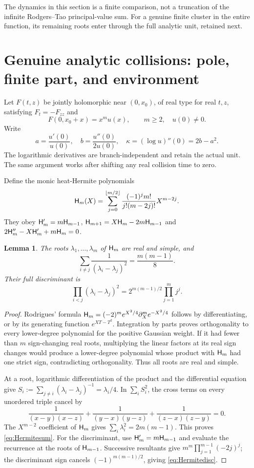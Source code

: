 \documentclass[11pt,a4paper]{article}
\newtheorem{lemma}[theorem]{Lemma}
\theoremstyle{definition}
\begin{document}
The dynamics in this section is a finite comparison, not a truncation of the infinite Rodgers--Tao principal-value sum. For a genuine finite cluster in the entire function, its remaining roots enter through the full analytic unit, retained next.

\section{Genuine analytic collisions: pole, finite part, and environment}
Let $F(t,z)$ be jointly holomorphic near $(0,x_0)$, of real type for real $t,z$, satisfying $F_t=-F_{zz}$ and
\[
 F(0,x_0+x)=x^m u(x),\qquad m\ge2,\quad u(0)\ne0.
\]
Write
\[
 a=\frac{u'(0)}{u(0)},\quad b=\frac{u''(0)}{2u(0)},\quad
 \kappa=(\log u)''(0)=2b-a^2.
\]
The logarithmic derivatives are branch-independent and retain the actual unit. The same argument works after shifting any real collision time to zero.

Define the monic heat-Hermite polynomials
\[
 \mathsf H_m(X)=\sum_{j=0}^{\lfloor m/2\rfloor}
 \frac{(-1)^j m!}{j!(m-2j)!}X^{m-2j}.
\]
They obey $\mathsf H_m'=m\mathsf H_{m-1}$,
$\mathsf H_{m+1}=X\mathsf H_m-2m\mathsf H_{m-1}$ and
$2\mathsf H_m''-X\mathsf H_m'+m\mathsf H_m=0$.

\begin{lemma}\label{lem:hermite}
The roots $\lambda_1,\ldots,\lambda_m$ of $\mathsf H_m$ are real and simple, and
\begin{equation}\label{eq:Hermitesum}
 \sum_{i\ne j}\frac1{(\lambda_i-\lambda_j)^2}
 =\frac{m(m-1)}8.
\end{equation}
Their full discriminant is
\begin{equation}\label{eq:Hermitedisc}
 \prod_{i<j}(\lambda_i-\lambda_j)^2
 =2^{m(m-1)/2}\prod_{j=1}^m j^j.
\end{equation}
\end{lemma}
\begin{proof}
Rodrigues' formula $\mathsf H_m=(-2)^m e^{X^2/4}\partial_X^m e^{-X^2/4}$ follows by differentiating, or by its generating function $e^{XT-T^2}$. Integration by parts proves orthogonality to every lower-degree polynomial for the positive Gaussian weight. If it had fewer than $m$ sign-changing real roots, multiplying the linear factors at its real sign changes would produce a lower-degree polynomial whose product with $\mathsf H_m$ had one strict sign, contradicting orthogonality. Thus all roots are real and simple.

At a root, logarithmic differentiation of the product and the differential equation give
$S_i:=\sum_{j\ne i}(\lambda_i-\lambda_j)^{-1}=\lambda_i/4$.
In $\sum_iS_i^2$, the cross terms on every unordered triple cancel by
\[
 \frac1{(x-y)(x-z)}+\frac1{(y-x)(y-z)}
 +\frac1{(z-x)(z-y)}=0.
\]
The $X^{m-2}$ coefficient of $\mathsf H_m$ gives
$\sum_i\lambda_i^2=2m(m-1)$. This proves \eqref{eq:Hermitesum}.
For the discriminant, use $\mathsf H_m'=m\mathsf H_{m-1}$ and evaluate the recurrence at the roots of $\mathsf H_{m-1}$. Successive resultants give $m^m\prod_{j=1}^{m-1}(-2j)^j$; the discriminant sign cancels $(-1)^{m(m-1)/2}$, giving \eqref{eq:Hermitedisc}.
\end{proof}
\end{document}
